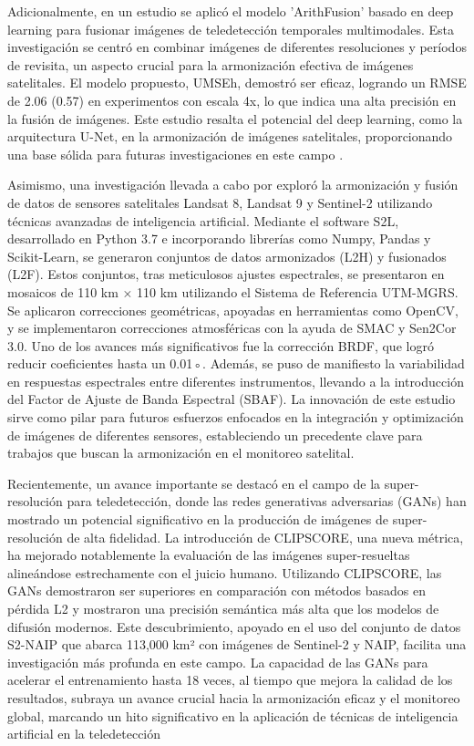         Adicionalmente, en un estudio se aplicó el modelo ’ArithFusion’ basado en deep learning para fusionar imágenes de teledetección temporales multimodales. Esta investigación se centró en combinar imágenes de diferentes resoluciones y períodos de revisita, un aspecto crucial para la armonización efectiva de imágenes satelitales. El modelo propuesto, UMSEh, demostró ser eficaz, logrando un RMSE de 2.06 (0.57) en experimentos con escala 4x, lo que indica una alta precisión en la fusión de imágenes. Este estudio resalta el potencial del deep learning, como la arquitectura U-Net, en la armonización de imágenes satelitales, proporcionando una base sólida para futuras investigaciones en este campo \autocite{hoque2022arithfusion}. 
        
        Asimismo, una investigación llevada a cabo por \textcite{saunier2022sen2like} exploró la armonización y fusión de datos de sensores satelitales Landsat 8, Landsat 9 y Sentinel-2 utilizando técnicas avanzadas de inteligencia artificial. Mediante el software S2L, desarrollado en Python 3.7 e incorporando librerías como Numpy, Pandas y Scikit-Learn, se generaron conjuntos de datos armonizados (L2H) y fusionados (L2F). Estos conjuntos, tras meticulosos ajustes espectrales, se presentaron en mosaicos de 110 km × 110 km utilizando el Sistema de Referencia UTM-MGRS. Se aplicaron correcciones geométricas, apoyadas en herramientas como OpenCV, y se implementaron correcciones atmosféricas con la ayuda de SMAC y Sen2Cor 3.0. Uno de los avances más significativos fue la corrección BRDF, que logró reducir coeficientes hasta un 0.01◦. Además, se puso de manifiesto la variabilidad en respuestas espectrales entre diferentes instrumentos, llevando a la introducción del Factor de Ajuste de Banda Espectral (SBAF). La innovación de este estudio sirve como pilar para futuros esfuerzos enfocados en la integración y optimización de imágenes de diferentes sensores, estableciendo un precedente clave para trabajos que buscan la armonización en el monitoreo satelital.

        Recientemente, un avance importante se destacó en el campo de la super-resolución para teledetección, donde las redes generativas adversarias (GANs) han mostrado un potencial significativo en la producción de imágenes de super-resolución de alta fidelidad. La introducción de CLIPSCORE, una nueva métrica, ha mejorado notablemente la evaluación de las imágenes super-resueltas alineándose estrechamente con el juicio humano. Utilizando CLIPSCORE, las GANs demostraron ser superiores en comparación con métodos basados en pérdida L2 y mostraron una precisión semántica más alta que los modelos de difusión modernos. Este descubrimiento, apoyado en el uso del conjunto de datos S2-NAIP que abarca 113,000 km² con imágenes de Sentinel-2 y NAIP, facilita una investigación más profunda en este campo. La capacidad de las GANs para acelerar el entrenamiento hasta 18 veces, al tiempo que mejora la calidad de los resultados, subraya un avance crucial hacia la armonización eficaz y el monitoreo global, marcando un hito significativo en la aplicación de técnicas de inteligencia artificial en la teledetección \autocite{asdf}

